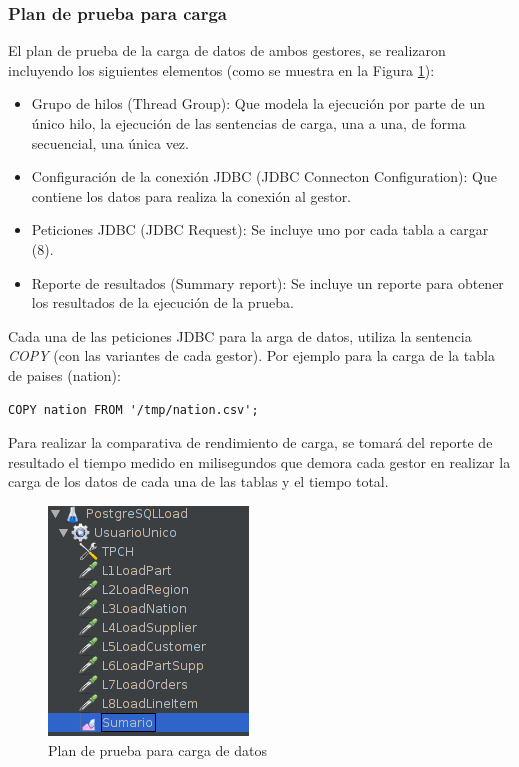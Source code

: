 \documentclass[11pt, twocolumns]{article}
\begin{document}
\begin{multicols}{2}
\subsubsection{Plan de prueba para carga}
El plan de prueba de la carga de datos de ambos gestores, se realizaron incluyendo los siguientes elementos (como se muestra en la Figura \ref{figura:plan_carga_pg}):
\begin{itemize}
  \item Grupo de hilos (Thread Group): Que modela la ejecución por parte de un único hilo, la ejecución de las sentencias de carga, una a una, de forma secuencial, una única vez.
  \item Configuración de la conexión JDBC (JDBC Connecton Configuration): Que contiene los datos para realiza la conexión al gestor. 
  \item Peticiones JDBC (JDBC Request): Se incluye uno por cada tabla a cargar (8).
  \item Reporte de resultados (Summary report): Se incluye un reporte para obtener los resultados de la ejecución de la prueba.
\end{itemize}
Cada una de las peticiones JDBC para la arga de datos, utiliza la sentencia \textit{COPY} (con las variantes de cada gestor). Por ejemplo para la carga de la tabla de paises (nation): 
\begin{verbatim}
COPY nation FROM '/tmp/nation.csv';
\end{verbatim}
Para realizar la comparativa de rendimiento de carga, se tomará del reporte de resultado el tiempo medido en milisegundos que demora cada gestor en realizar la carga de los datos de cada una de las tablas y el tiempo total.
\begin{figure}[H]
  \includegraphics[scale=0.7]{plan_carga_pg.png}
  \centering
  \caption{Plan de prueba para carga de datos}
  \label{figura:plan_carga_pg}
\end{figure}


\end{multicols}
\end{document}
